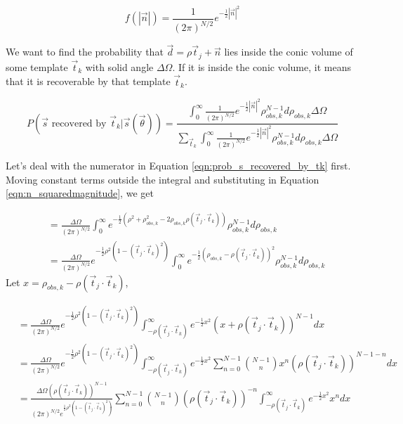 \documentclass[12pt]{article}
\newcommand{\ptjtk}{\rho(\vec{t}_j\cdot\vec{t}_k)}
\begin{document}
   \begin{equation}
   f(|\vec{n}|) = \frac{1}{(2\pi)^{N/2}}e^{-\frac{1}{2}|\vec{n}|^2}
   \end{equation}

We want to find the probability that $\vec{d}=\rho\vec{t}_j+\vec{n}$ lies inside the conic volume of some template $\vec{t}_k$ with solid angle $\Delta\Omega$. If it is inside the conic volume, it means that it is recoverable by that template $\vec{t}_k$.

   \begin{equation}
   P(\text{$\vec{s}$ recovered by $\vec{t}_k$}|\vec{s}(\vec\theta)) = \frac{\int_0^\infty \frac{1}{(2\pi)^{N/2}} e^{-\frac{1}{2} |\vec{n}|^2} {\rho^{N-1}_{obs,k}} d\rho_{obs,k} \Delta\Omega}
   {\sum_{\vec{t}_k} \int_0^\infty \frac{1}{(2\pi)^{N/2}} e^{-\frac{1}{2} |\vec{n}|^2} {\rho^{N-1}_{obs,k}} d\rho_{obs,k} \Delta\Omega}
   \label{eqn:prob_s_recovered_by_tk}
   \end{equation}

Let's deal with the numerator in Equation \ref{eqn:prob_s_recovered_by_tk} first. Moving constant terms outside the integral and substituting in Equation \ref{eqn:n_squaredmagnitude}, we get

   \begin{align}
   &= \frac{\Delta\Omega}{(2\pi)^{N/2}} \int_0^\infty  e^{-\frac{1}{2}( \rho^2 + \rho_{obs,k}^2 - 2\rho_{obs,k}\ptjtk)  } {\rho^{N-1}_{obs,k}} d\rho_{obs,k} \\
  &= \frac{\Delta\Omega}{(2\pi)^{N/2}} e^{-\frac{1}{2}\rho^2(1-(\vec{t}_j\cdot\vec{t}_k)^2)} \int_0^\infty  e^{-\frac{1}{2} (\rho_{obs,k} - \ptjtk)^2  } {\rho^{N-1}_{obs,k}} d\rho_{obs,k}
   \end{align}
Let $x = \rho_{obs,k} - \ptjtk$,

   \begin{align}
   &= \frac{\Delta\Omega}{(2\pi)^{N/2}} e^{-\frac{1}{2}\rho^2(1-(\vec{t}_j\cdot\vec{t}_k)^2)} \int_{-\ptjtk}^\infty  e^{-\frac{1}{2} x^2  } {(x+\ptjtk)^{N-1}} dx \\
   &= \frac{\Delta\Omega}{(2\pi)^{N/2}} e^{-\frac{1}{2}\rho^2(1-(\vec{t}_j\cdot\vec{t}_k)^2)} \int_{-\ptjtk}^\infty  e^{-\frac{1}{2} x^2  } {\sum_{n=0}^{N-1} \binom{N-1}{n}x^n(\ptjtk)^{N-1-n} } dx \\
   &= \frac{\Delta\Omega(\ptjtk)^{N-1}}{(2\pi)^{N/2}  e^{\frac{1}{2}\rho^2(1-(\vec{t}_j\cdot\vec{t}_k)^2)}}  \sum_{n=0}^{N-1} \binom{N-1}{n} (\ptjtk)^{-n} \int_{-\ptjtk}^\infty e^{-\frac{1}{2} x^2  } x^n  dx
   \end{align}
\end{document}
